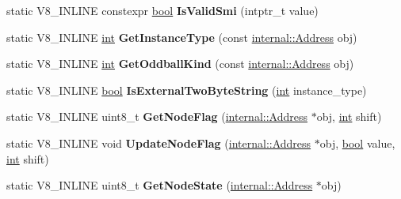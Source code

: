 \begin{DoxyCompactItemize}
static V8\+\_\+\+I\+N\+L\+I\+NE constexpr \mbox{\hyperlink{classbool}{bool}} {\bfseries Is\+Valid\+Smi} (intptr\+\_\+t value)
\item 
\mbox{\label{classv8_1_1internal_1_1Internals_a1e72cafe72b211a830d4043fa6cb292a}} 
static V8\+\_\+\+I\+N\+L\+I\+NE \mbox{\hyperlink{classint}{int}} {\bfseries Get\+Instance\+Type} (const \mbox{\hyperlink{classuintptr__t}{internal\+::\+Address}} obj)
\item 
\mbox{\label{classv8_1_1internal_1_1Internals_a1da181e205151dc45bc2de1f6c0a1713}} 
static V8\+\_\+\+I\+N\+L\+I\+NE \mbox{\hyperlink{classint}{int}} {\bfseries Get\+Oddball\+Kind} (const \mbox{\hyperlink{classuintptr__t}{internal\+::\+Address}} obj)
\item 
\mbox{\label{classv8_1_1internal_1_1Internals_afbf930e9dfde745b54e1e7e03b5b96c8}} 
static V8\+\_\+\+I\+N\+L\+I\+NE \mbox{\hyperlink{classbool}{bool}} {\bfseries Is\+External\+Two\+Byte\+String} (\mbox{\hyperlink{classint}{int}} instance\+\_\+type)
\item 
\mbox{\label{classv8_1_1internal_1_1Internals_aaa625b4cc76cec519a9a4bd8973015d3}} 
static V8\+\_\+\+I\+N\+L\+I\+NE uint8\+\_\+t {\bfseries Get\+Node\+Flag} (\mbox{\hyperlink{classuintptr__t}{internal\+::\+Address}} $\ast$obj, \mbox{\hyperlink{classint}{int}} shift)
\item 
\mbox{\label{classv8_1_1internal_1_1Internals_a7bceedc6da1b004ef3e689b8c50b77d9}} 
static V8\+\_\+\+I\+N\+L\+I\+NE void {\bfseries Update\+Node\+Flag} (\mbox{\hyperlink{classuintptr__t}{internal\+::\+Address}} $\ast$obj, \mbox{\hyperlink{classbool}{bool}} value, \mbox{\hyperlink{classint}{int}} shift)
\item 
\mbox{\label{classv8_1_1internal_1_1Internals_af747dfbe0a82350ba86abde1756631e1}} 
static V8\+\_\+\+I\+N\+L\+I\+NE uint8\+\_\+t {\bfseries Get\+Node\+State} (\mbox{\hyperlink{classuintptr__t}{internal\+::\+Address}} $\ast$obj)
\item 
\mbox{\label{classv8_1_1internal_1_1Internals_a50f41039e924a59c269d1340ce1da6b3}} 

\end{DoxyCompactItemize}
